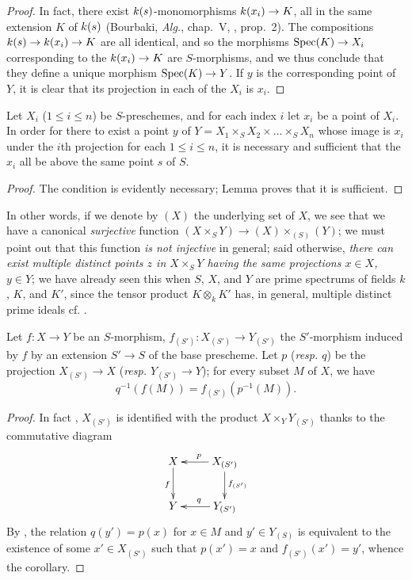 \begin{proof}
\label{proof-1.3.4.6}
In fact, there exist $k(s)$-monomorphisms $\kres(x_i)\to K$, all in the same extension $K$ of $k(s)$ (Bourbaki, \emph{Alg.}, chap.~V, , prop.~2).
The compositions $\kres(s)\to\kres(x_i)\to K$ are all identical, and so the morphisms $\Spec(K)\to X_i$ corresponding to the $\kres(x_i)\to K$ are $S$-morphisms, and we thus conclude that they define a unique morphism $\Spec(K)\to Y$.
If $y$ is the corresponding point of $Y$, it is clear that its projection in each of the $X_i$ is $x_i$.
\end{proof}

\begin{prop}[3.4.7]
\label{1.3.4.7}
Let $X_i$ ($1\leqslant i\leqslant n$) be $S$-preschemes, and for each index $i$ let $x_i$ be a point of $X_i$.
In order for there to exist a point $y$ of $Y=X_1\times_S X_2\times\ldots\times_S X_n$ whose image is $x_i$ under the $i$th projection for each $1\leqslant i\leqslant n$, it is necessary and sufficient that the $x_i$ all be above the same point $s$ of $S$.
\end{prop}

\begin{proof}
\label{proof-1.3.4.7}
The condition is evidently necessary; Lemma  proves that it is sufficient.
\end{proof}

In other words, if we denote by $(X)$ the underlying set of $X$, we see that we have a canonical \emph{surjective} function $(X\times_S Y)\to(X)\times_{(S)}(Y)$; we must point out that this function \emph{is not injective} in general; said otherwise, \emph{there can exist multiple distinct points $z$ in $X\times_S Y$ having the same projections $x\in X$, $y\in Y$}; we have already seen this when $S$, $X$, and $Y$ are prime spectrums of fields $k$, $K$, and $K'$, since the tensor product $K\otimes_k K'$ has, in general, multiple distinct prime ideals cf. .

\begin{cor}[3.4.8]
\label{1.3.4.8}
Let $f:X\to Y$ be an $S$-morphism, $f_{(S')}:X_{(S')}\to Y_{(S')}$ the $S'$-morphism induced by $f$ by an extension $S'\to S$ of the base prescheme.
Let $p$ (\emph{resp. $q$}) be the projection $X_{(S')}\to X$ (\emph{resp. $Y_{(S')}\to Y$}); for every subset $M$ of $X$, we have
\[
  q^{-1}(f(M))=f_{(S')}(p^{-1}(M)).
\]
\end{cor}

\begin{proof}
\label{proof-1.3.4.8}
In
fact , $X_{(S')}$ is identified with the product $X\times_Y Y_{(S')}$ thanks to the commutative diagram
\[
  \xymatrix{
    X\ar[d]_f &
    X_{(S')}\ar[l]_p\ar[d]^{f_{(S')}}\\
    Y &
    Y_{(S')}\ar[l]_q
  }
\]
By , the relation $q(y')=p(x)$ for $x\in M$ and $y'\in Y_{(S)}$ is equivalent to the existence of some $x'\in X_{(S')}$ such that $p(x')=x$ and $f_{(S')}(x')=y'$, whence the corollary.
\end{proof}

